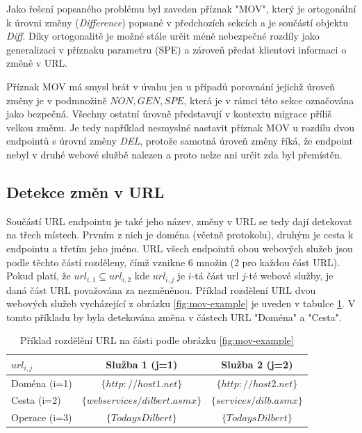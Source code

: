 \documentclass[czech,DP]{thesiskiv}
\begin{document}
Jako řešení popsaného problému byl zaveden příznak "MOV", který je ortogonální k úrovni změny (\textit{Difference}) popsané v předchozích sekcích a je součástí objektu \textit{Diff}. Díky ortogonalitě je možné stále určit méně nebezpečné rozdíly jako generalizaci v příznaku parametru (SPE) a zároveň předat klientovi informaci o změně v URL. 

Příznak MOV má smysl brát v úvahu jen u případů porovnání jejichž úroveň změny je v podmnožině ${NON, GEN, SPE}$, která je v rámci této sekce označována jako bezpečná. Všechny ostatní úrovně představují v kontextu migrace příliš velkou změnu. Je tedy  například nesmyslné nastavit příznak MOV u rozdílu dvou endpointů s úrovní změny \textit{DEL}, protože samotná úroveň změny říká, že endpoint nebyl v druhé webové službě nalezen a proto nelze ani určit zda byl přemístěn.  

\subsection{Detekce změn v URL}

Součástí URL endpointu je také jeho název, změny v URL se tedy dají detekovat na třech místech. Prvním z nich je doména (včetně protokolu), druhým je cesta k endpointu a třetím jeho jméno. URL všech endpointů obou webových služeb jsou podle těchto částí rozděleny, čímž vznikne 6 množin (2 pro každou část URL). Pokud platí, že $url_{i,1} \subseteq url_{i,2}$ kde $url_{i,j}$ je $i$-tá část url $j$-té webové služby, je daná část URL považována za nezměněnou. Příklad rozdělení URL dvou webových služeb vycházející z obrázku \ref{fig:mov-example} je uveden v tabulce \ref{tab:url-diff-example}. V tomto příkladu by byla detekována změna v částech URL "Doména" a "Cesta".

\begin{table}[h]
	\begin{tabular}{|l|c|c|}
		\hline
		$url_{i,j}$ & Služba 1 (j=1) & Služba 2 (j=2) \\
		\hline
		\hline
		Doména (i=1) & $\{http://host1.net\}$ & $\{http://host2.net\}$ \\
		\hline
		Cesta (i=2) & $\{webservices/dilbert.asmx\}$ &  $\{services/dilb.asmx\}$ \\
		\hline
		Operace (i=3) & $\{TodaysDilbert\}$ & $\{TodaysDilbert\}$ \\
		\hline
	\end{tabular}
	\caption{Příklad rozdělění URL na části podle obrázku \ref{fig:mov-example}}
	\label{tab:url-diff-example}
\end{table}
  
\end{document}
